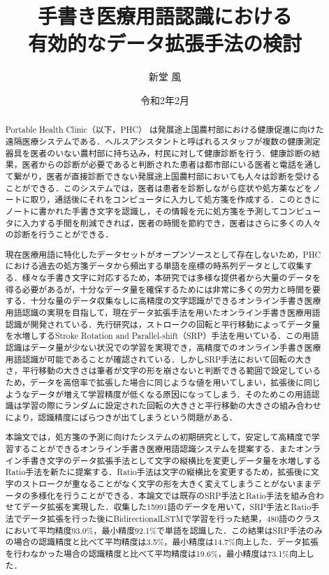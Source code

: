 \documentclass[a4paper,12pt]{jreport}
\title{手書き医療用語認識における\\有効的なデータ拡張手法の検討}
\author{新堂 風}
\date{令和2年2月}
\begin{document}
\maketitle
\thispagestyle{empty}

\begin{abstract}
 Portable Health Clinic（以下，PHC） は発展途上国農村部における健康促進に向けた遠隔医療システムである．ヘルスアシスタントと呼ばれるスタッフが複数の健康測定器具を医者のいない農村部に持ち込み，村民に対して健康診断を行う．健康診断の結果，医者からの診断が必要であると判断された患者は都市部にいる医者と電話を通して繋がり，医者が直接診断できない発展途上国農村部においても人々は診断を受けることができる．このシステムでは，医者は患者を診断しながら症状や処方薬などをノートに取り，通話後にそれをコンピュータに入力して処方箋を作成する．このときにノートに書かれた手書き文字を認識し，その情報を元に処方箋を予測してコンピュータに入力する手間を削減できれば，医者の時間を節約でき，医者はさらに多くの人々の診断を行うことができる．

現在医療用語に特化したデータセットがオープンソースとして存在しないため，PHCにおける過去の処方箋データから頻出する単語を座標の時系列データとして収集する．様々な手書き文字に対応するため，本研究では多様な提供者から大量のデータを得る必要があるが，十分なデータ量を確保するためには非常に多くの労力と時間を要する．十分な量のデータ収集なしに高精度の文字認識ができるオンライン手書き医療用語認識の実現を目指して，現在データ拡張手法を用いたオンライン手書き医療用語認識\cite{takahashi}が開発されている．先行研究\cite{takahashi}は，ストロークの回転と平行移動によってデータ量を水増しするStroke Rotation and Parallel-shift（SRP）手法を用いている．この用語認識はデータ量が少ない状況での学習を実現でき，高精度でのオンライン手書き医療用語認識が可能であることが確認されている．しかしSRP手法において回転の大きさ，平行移動の大きさは筆者が文字の形を崩さないと判断できる範囲で設定しているため，データを高倍率で拡張した場合に同じような値を用いてしまい，拡張後に同じようなデータが増えて学習精度が低くなる原因になってしまう．そのためこの用語認識は学習の際にランダムに設定された回転の大きさと平行移動の大きさの組み合わせにより，認識精度にばらつきが出てしまうという問題がある．

本論文では，処方箋の予測に向けたシステムの初期研究として，安定して高精度で学習することができるオンライン手書き医療用語認識システムを提案する．またオンライン手書き文字のデータ拡張手法として文字の縦横比を変更しデータ量を水増しするRatio手法を新たに提案する．Ratio手法は文字の縦横比を変更するため，拡張後に文字のストロークが重なることがなく文字の形を大きく変えてしまうことがないままデータの多様化を行うことができる．本論文では既存のSRP手法とRatio手法を組み合わせてデータ拡張を実現した．収集した15991語のデータを用いて，SRP手法とRatio手法でデータ拡張を行った後にBidirectionalLSTMで学習を行った結果，480語のクラスにおいて平均精度93.0\%，最小精度92.1\%で単語を認識した．この結果はSRP手法のみの場合の認識精度と比べて平均精度は3.5\%，最小精度は14.7\%向上した．データ拡張を行わなかった場合の認識精度と比べて平均精度は19.6\%，最小精度は73.1\%向上した．
\end{abstract}
\end{document}
